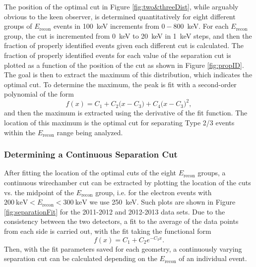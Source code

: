 The position of the optimal cut in Figure \ref{fig:two&threeDist}, while arguably obvious
to the keen observer, is determined quantitatively for eight different groups of $E_{\mathrm{recon}}$ events in
100~keV increments from $0-800$~keV. For each $E_{\mathrm{recon}}$ group,
the cut is incremented from 0~keV to 20~keV in 1~keV steps, and then the fraction
of properly identified events given each different cut is calculated. The fraction of properly identified events for
each value of the separation cut is plotted as a function of the position of the cut as shown
in Figure \ref{fig:propID}. The goal is then to extract the maximum of this distribution, which
indicates the optimal cut. To determine the maximum, the peak is fit with a second-order polynomial
of the form
%
\begin{equation}
  f(x) = C_1 + C_2\big(x-C_3\big) + C_4\big(x-C_3\big)^2,
\end{equation}
%
and then the maximum is extracted using the derivative of the fit function. The location
of this maximum is the optimal cut for separating Type 2/3 events within the $E_{\mathrm{recon}}$  
range being analyzed.



\subsubsection{Determining a Continuous Separation Cut}

After fitting the location of the optimal cuts of the eight $E_{\mathrm{recon}}$ groups, a
continuous wirechamber cut can be extracted by plotting the location of the cuts vs. the
midpoint of the $E_{\mathrm{recon}}$ group, i.e. for the electron events with
$200\mathrm{~keV}<E_{\mathrm{recon}}<300\mathrm{~keV}$ we use 250~keV. Such plots are shown in
Figure \ref{fig:separationFit} for the 2011-2012
and 2012-2013 data sets. Due to the consistency between the two detectors, a fit to the
average of the data points from each side is carried out, with the fit taking the
functional form 
%
\begin{equation}
  f(x) = C_1 + C_2e^{-C_3x}.
\end{equation}
Then, with the fit parameters saved for each geometry, a continuously varying separation
cut can be calculated depending on the $E_{\mathrm{recon}}$ of an individual event.


